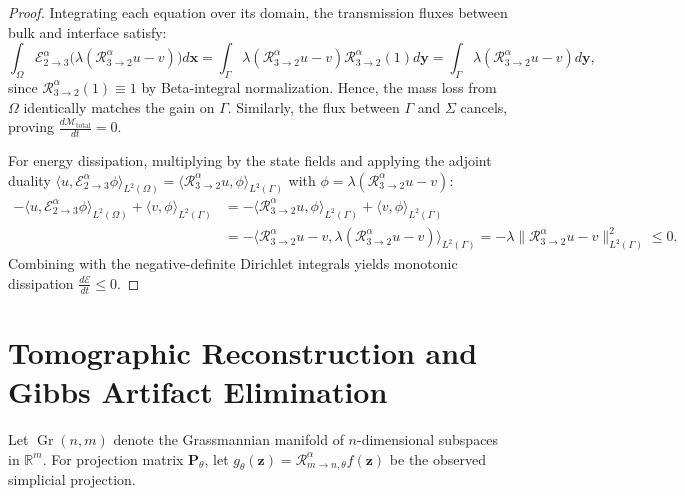 \documentclass[11pt,a4paper]{article}
\theoremstyle{plain}
\theoremstyle{definition}
\theoremstyle{remark}
\numberwithin{equation}{section}
\begin{document}
\begin{proof}
Integrating each equation over its domain, the transmission fluxes between bulk and interface satisfy:
\begin{equation}
\int_\Omega \mathcal{E}_{2 \to 3}^\alpha \big(\lambda (\mathcal{R}_{3 \to 2}^\alpha u - v)\big) d\mathbf{x} = \int_\Gamma \lambda (\mathcal{R}_{3 \to 2}^\alpha u - v) \mathcal{R}_{3 \to 2}^\alpha(1) d\mathbf{y} = \int_\Gamma \lambda (\mathcal{R}_{3 \to 2}^\alpha u - v) d\mathbf{y},
\end{equation}
since $\mathcal{R}_{3 \to 2}^\alpha(1) \equiv 1$ by Beta-integral normalization. Hence, the mass loss from $\Omega$ identically matches the gain on $\Gamma$. Similarly, the flux between $\Gamma$ and $\Sigma$ cancels, proving $\frac{d\mathcal{M}_{\text{total}}}{dt} = 0$.

For energy dissipation, multiplying by the state fields and applying the adjoint duality $\langle u, \mathcal{E}_{2 \to 3}^\alpha \phi \rangle_{L^2(\Omega)} = \langle \mathcal{R}_{3 \to 2}^\alpha u, \phi \rangle_{L^2(\Gamma)}$ with $\phi = \lambda(\mathcal{R}_{3 \to 2}^\alpha u - v)$:
\begin{align*}
-\langle u, \mathcal{E}_{2 \to 3}^\alpha \phi \rangle_{L^2(\Omega)} + \langle v, \phi \rangle_{L^2(\Gamma)} &= -\langle \mathcal{R}_{3 \to 2}^\alpha u, \phi \rangle_{L^2(\Gamma)} + \langle v, \phi \rangle_{L^2(\Gamma)} \\
&= -\langle \mathcal{R}_{3 \to 2}^\alpha u - v, \lambda(\mathcal{R}_{3 \to 2}^\alpha u - v) \rangle_{L^2(\Gamma)} = -\lambda \|\mathcal{R}_{3 \to 2}^\alpha u - v\|_{L^2(\Gamma)}^2 \le 0.
\end{align*}
Combining with the negative-definite Dirichlet integrals yields monotonic dissipation $\frac{d\mathcal{E}}{dt} \le 0$.
\end{proof}

\section{Tomographic Reconstruction and Gibbs Artifact Elimination}

Let $\operatorname{Gr}(n, m)$ denote the Grassmannian manifold of $n$-dimensional subspaces in $\mathbb{R}^m$. For projection matrix $\mathbf{P}_\theta$, let $g_\theta(\mathbf{z}) = \mathcal{R}_{m \to n, \theta}^\alpha f(\mathbf{z})$ be the observed simplicial projection.
\end{document}
